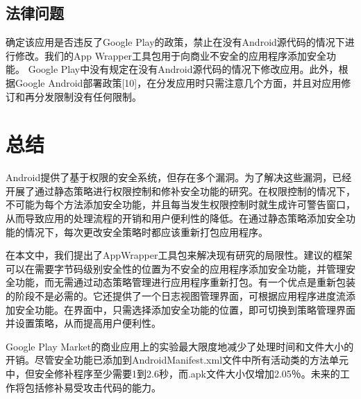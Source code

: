 		\subsection{法律问题}
	
			确定该应用是否违反了Google Play的政策，禁止在没有Android源代码的情况下进行修改。我们的App Wrapper工具包用于向商业不安全的应用程序添加安全功能。 Google Play中没有规定在没有Android源代码的情况下修改应用。此外，根据Google Android部署政策[10]，在分发应用时只需注意几个方面，并且对应用修订和再分发限制没有任何限制。
		
	\section{总结}
		Android提供了基于权限的安全系统，但存在多个漏洞。为了解决这些漏洞，已经开展了通过静态策略进行权限控制和修补安全功能的研究。在权限控制的情况下，不可能为每个方法添加安全功能，并且每当发生权限控制时就生成许可警告窗口，从而导致应用的处理流程的开销和用户便利性的降低。在通过静态策略添加安全功能的情况下，每次更改安全策略时都应该重新打包应用程序。

		在本文中，我们提出了AppWrapper工具包来解决现有研究的局限性。建议的框架可以在需要字节码级别安全性的位置为不安全的应用程序添加安全功能，并管理安全功能，而无需通过动态策略管理进行应用程序重新打包。有一个优点是重新包装的阶段不是必需的。它还提供了一个日志视图管理界面，可根据应用程序进度流添加安全功能。在界面中，只需选择添加安全功能的位置，即可切换到策略管理界面并设置策略，从而提高用户便利性。

		Google Play Market的商业应用上的实验最大限度地减少了处理时间和文件大小的开销。尽管安全功能已添加到AndroidManifest.xml文件中所有活动类的方法单元中，但安全修补程序至少需要1到2.6秒，而.apk文件大小仅增加2.05％。未来的工作将包括修补易受攻击代码的能力。